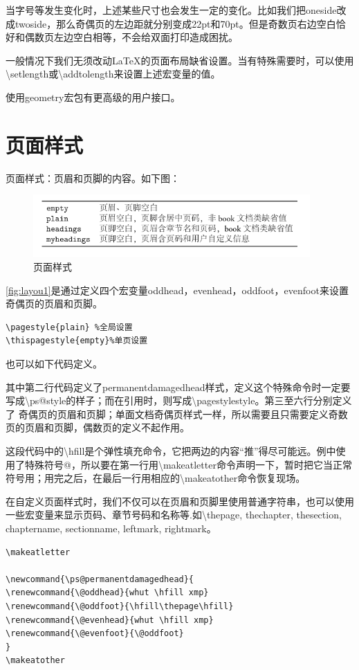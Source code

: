 \documentclass[UTF8]{article}
\begin{document}
当字号等发生变化时，上述某些尺寸也会发生一定的变化。比如我们把oneside改成twoside，那么奇偶页的左边距就分别变成22pt和70pt。但是奇数页右边空白恰好和偶数页左边空白相等，不会给双面打印造成困扰。

一般情况下我们无须改动\LaTeX 的页面布局缺省设置。当有特殊需要时，可以使用\textbackslash setlength或\textbackslash addtolength来设置上述宏变量的值。

使用geometry宏包有更高级的用户接口。

\section{页面样式}
页面样式：页眉和页脚的内容。如下图：
\begin{figure}[htbp]
	\centering
	\includegraphics[width=300pt]{layout1.png}
	\caption{页面样式}
	\label{fig:layout1}
\end{figure}
\ref{fig:layou1}是通过定义四个宏变量oddhead，evenhead，oddfoot，evenfoot来设置奇偶页的页眉和页脚。

\begin{lstlisting}
\pagestyle{plain} %全局设置
\thispagestyle{empty}%单页设置
\end{lstlisting}

也可以如下代码定义。

其中第二行代码定义了permanentdamagedhead样式，定义这个特殊命令时一定要写成\textbackslash ps@style的样子；而在引用时，则写成\textbackslash pagestyle{style}。第三至六行分别定义了
奇偶页的页眉和页脚；单面文档奇偶页样式一样，所以需要且只需要定义奇数页的页眉和页脚，偶数页的定义不起作用。

这段代码中的\textbackslash hfill是个弹性填充命令，它把两边的内容“推”得尽可能远。例中使用了特殊符号@，所以要在第一行用\textbackslash makeatletter命令声明一下，暂时把它当正常符号用；用完之后，在最后一行用相应的\textbackslash makeatother命令恢复现场。

在自定义页面样式时，我们不仅可以在页眉和页脚里使用普通字符串，也可以使用一些宏变量来显示页码、章节号码和名称等.如\textbackslash thepage, thechapter, thesection, chaptername, sectionname, leftmark, rightmark。
\begin{lstlisting}
\makeatletter

\newcommand{\ps@permanentdamagedhead}{
\renewcommand{\@oddhead}{whut \hfill xmp}
\renewcommand{\@oddfoot}{\hfill\thepage\hfill}
\renewcommand{\@evenhead}{whut \hfill xmp}
\renewcommand{\@evenfoot}{\@oddfoot}
}
\makeatother	

\end{lstlisting}
\end{document}
